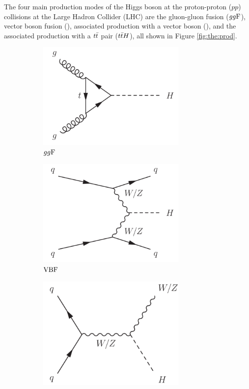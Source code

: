 The four main production modes of the Higgs boson at the proton-proton ($pp$) collisions
at the Large Hadron Collider (LHC) are the gluon-gluon fusion ($gg\text{F}$), vector boson fusion
(\vbf), associated production with a vector boson (\vh), and the associated production with
a $t\bar{t}$ pair ($t\bar{t} H$), all shown in Figure \ref{fig:the:prod}.

\begin{figure}[h]
  \centering
  \begin{subfigure}[b]{0.5\textwidth}
    \centering
    \includegraphics[width=0.8\textwidth]{figures/theory/ggF}
    \caption{$gg\text{F}$}
  \end{subfigure}%
  \begin{subfigure}[b]{0.5\textwidth}
    \centering
    \includegraphics[width=0.8\textwidth]{figures/theory/VBF}
    \caption{$\text{VBF}$}
  \end{subfigure}
  \begin{subfigure}[b]{0.5\textwidth}
    \centering
    \includegraphics[width=0.8\textwidth]{figures/theory/VH}

\end{subfigure}
\end{figure}
